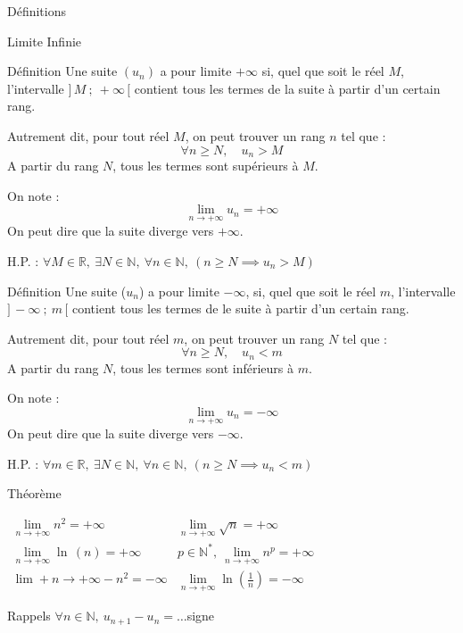 \documentclass{cours}
\begin{document}
    \begin{Gpartie}{Définitions} 
        \begin{Spartie}{Limite Infinie}
            \vspace*{-2ex}
            \begin{SSpartie}{Définition} 
                Une suite $(u_n)$ a pour limite $+\infty$ si, quel que soit le réel $M$, l'intervalle $\big]\,M~;~+\infty\,\big[$ contient tous les termes de la suite à partir d'un certain rang.

                Autrement dit, pour tout réel $M$, on peut trouver un rang $n$ tel que : \[\forall n\geq N,\quad u_n>M\]
                A partir du rang $N$, tous les termes sont supérieurs à $M$.

                On note : \[\boxed{\lim\limits_{n\to +\infty} u_n=+\infty}\] On peut dire que la suite diverge vers $+\infty$.

                H.P. : $\forall M\in\mathbb{R},~\exists N\in\mathbb{N},~\forall n\in\mathbb{N},~(n\geq N\implies u_n>M)$
            \end{SSpartie}
            \begin{SSpartie}{Définition} 
                Une suite ($u_n$) a pour limite $-\infty$, si, quel que soit le réel $m$, l'intervalle $\big]\,-\infty~;~m\,\big[$ contient tous les termes de le suite à partir d'un certain rang.

                Autrement dit, pour tout réel $m$, on peut trouver un rang $N$ tel que : \[\forall n\geq N,\quad u_n<m\]
                A partir du rang $N$, tous les termes sont inférieurs à $m$.

                On note : \[\boxed{\lim\limits_{n\to +\infty} u_n=-\infty}\] On peut dire que la suite diverge vers $-\infty$.

                H.P. : $\forall m\in\mathbb{R},~\exists N\in\mathbb{N},~\forall n\in\mathbb{N},~(n\geq N\implies u_n<m)$
            \end{SSpartie}
            \begin{SSpartie}{Théorème}
                \begin{center}$\begin{array}{cc}
                    \lim\limits_{n\to +\infty} n^2=+\infty & \lim\limits_{n\to +\infty} \sqrt{n}=+\infty \\
    
                    \lim\limits_{n\to +\infty} \ln\,(n)=+\infty & p\in\mathbb{N^*},\ \lim\limits_{n\to +\infty} n^p=+\infty \\
                    \lim\limits+{n\to +\infty} -n^2=-\infty & \lim\limits_{n\to +\infty} \ln\left(\frac{1}{n}\right)=-\infty
                \end{array}$\end{center}
            \end{SSpartie}
            \begin{SSpartie}{Rappels} 
                $\forall n\in\mathbb{N},\ u_{n+1}-u_n=\dotsc$\quad signe


\end{SSpartie}
\end{Spartie}
\end{Gpartie}
\end{document}
